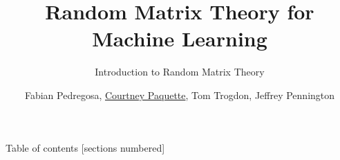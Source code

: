 \documentclass[10pt]{beamer}
\title{Random Matrix Theory for Machine Learning}
\subtitle{Introduction to Random Matrix Theory}
\date{}
\author{Fabian Pedregosa, \underline{Courtney Paquette}, Tom Trogdon, Jeffrey Pennington}
\institute{\url{https://random-matrix-learning.github.io}}
\begin{document}
\nocite{liao2019random,bai2010spectral,baik2006eigenvalues,bai2005CLT,bun2016cleaning,pennington2017geometry}

\maketitle

\begin{frame}{Table of contents}
  [sections numbered]
  \tableofcontents%
\end{frame}




\end{document}
